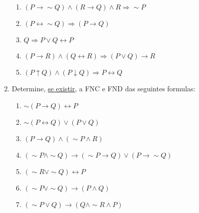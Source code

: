 \documentclass[12pt, a4paper,final]{article}
\begin{document}
\begin{enumerate}
\begin{enumerate}[label=(\alph*)]
            \item $(P \rightarrow \sim Q) \wedge (R \rightarrow Q) \wedge R \Rightarrow \sim P$ %
            
            \item $(P \leftrightarrow  \sim Q) \Rightarrow (P \rightarrow Q)$ %
            
            \item $Q \Rightarrow P \vee Q \leftrightarrow P$ %
            
            \item $(P \rightarrow R) \wedge (Q \leftrightarrow R) \Rightarrow (P \vee Q) \rightarrow R$ %
            
            \item $(P \uparrow Q) \wedge (P \downarrow Q) \Rightarrow P \leftrightarrow Q$ %
            
        \end{enumerate}
        
        \item Determine, \underline{se existir}, a FNC e FND das seguintes formulas:
        
        \begin{enumerate}[label=(\alph*)]
            \item $\sim (P \rightarrow Q) \leftrightarrow P$ %
            
            \item $\sim (P \leftrightarrow Q) \vee (P \vee Q)$%
            
            \item $(P \rightarrow Q) \wedge (\sim P \wedge R)$ %
            
            \item $(\sim P \wedge \sim Q) \rightarrow (\sim P \rightarrow Q ) \vee (P \rightarrow \sim Q)$ %
            
            \item $(\sim R \vee \sim Q) \leftrightarrow P$ %
            
            \item $(\sim P \vee \sim Q) \rightarrow (P \wedge Q)$ %
            
            \item $(\sim P \vee Q) \rightarrow (Q \wedge \sim R \wedge P)$ %
            

\end{enumerate}
\end{enumerate}
\end{document}
